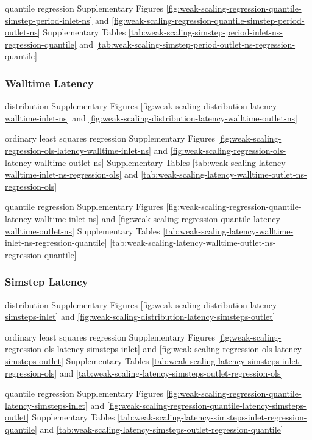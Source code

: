 quantile regression Supplementary Figures \ref{fig:weak-scaling-regression-quantile-simstep-period-inlet-ns} and \ref{fig:weak-scaling-regression-quantile-simstep-period-outlet-ns}
Supplementary Tables \ref{tab:weak-scaling-simstep-period-inlet-ns-regression-quantile} and \ref{tab:weak-scaling-simstep-period-outlet-ns-regression-quantile}

\subsubsection{Walltime Latency}

distribution Supplementary Figures \ref{fig:weak-scaling-distribution-latency-walltime-inlet-ns} and \ref{fig:weak-scaling-distribution-latency-walltime-outlet-ns}

ordinary least squares regression Supplementary Figures \ref{fig:weak-scaling-regression-ols-latency-walltime-inlet-ns} and \ref{fig:weak-scaling-regression-ols-latency-walltime-outlet-ns} Supplementary Tables \ref{tab:weak-scaling-latency-walltime-inlet-ns-regression-ols} and \ref{tab:weak-scaling-latency-walltime-outlet-ns-regression-ols}

quantile regression Supplementary Figures \ref{fig:weak-scaling-regression-quantile-latency-walltime-inlet-ns} and \ref{fig:weak-scaling-regression-quantile-latency-walltime-outlet-ns}
Supplementary Tables \ref{tab:weak-scaling-latency-walltime-inlet-ns-regression-quantile} \ref{tab:weak-scaling-latency-walltime-outlet-ns-regression-quantile}


\subsubsection{Simstep Latency}

distribution Supplementary Figures \ref{fig:weak-scaling-distribution-latency-simsteps-inlet} and \ref{fig:weak-scaling-distribution-latency-simsteps-outlet}

ordinary least squares regression Supplementary Figures \ref{fig:weak-scaling-regression-ols-latency-simsteps-inlet} and \ref{fig:weak-scaling-regression-ols-latency-simsteps-outlet} Supplementary Tables \ref{tab:weak-scaling-latency-simsteps-inlet-regression-ols} and \ref{tab:weak-scaling-latency-simsteps-outlet-regression-ols}

quantile regression Supplementary Figures \ref{fig:weak-scaling-regression-quantile-latency-simsteps-inlet} and \ref{fig:weak-scaling-regression-quantile-latency-simsteps-outlet}
Supplementary Tables \ref{tab:weak-scaling-latency-simsteps-inlet-regression-quantile} and \ref{tab:weak-scaling-latency-simsteps-outlet-regression-quantile}

